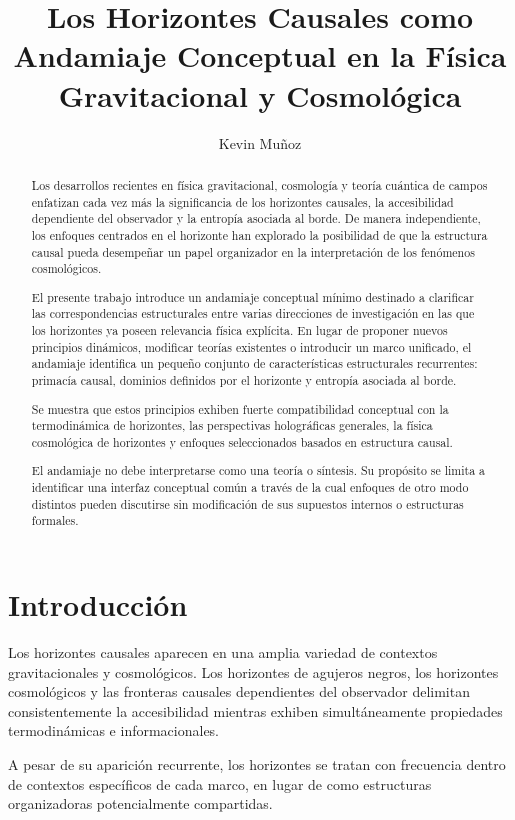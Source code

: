 \documentclass[12pt,a4paper]{article}
\title{Los Horizontes Causales como Andamiaje Conceptual en la F\'isica Gravitacional y Cosmol\'ogica}
\author{Kevin Mu\~noz}
\date{}
\begin{document}
\maketitle

\begin{abstract}
Los desarrollos recientes en física gravitacional, cosmología y teoría cuántica de campos enfatizan cada vez más la significancia de los horizontes causales, la accesibilidad dependiente del observador y la entropía asociada al borde. De manera independiente, los enfoques centrados en el horizonte han explorado la posibilidad de que la estructura causal pueda desempeñar un papel organizador en la interpretación de los fenómenos cosmológicos.

El presente trabajo introduce un andamiaje conceptual mínimo destinado a clarificar las correspondencias estructurales entre varias direcciones de investigación en las que los horizontes ya poseen relevancia física explícita. En lugar de proponer nuevos principios dinámicos, modificar teorías existentes o introducir un marco unificado, el andamiaje identifica un pequeño conjunto de características estructurales recurrentes: primacía causal, dominios definidos por el horizonte y entropía asociada al borde.

Se muestra que estos principios exhiben fuerte compatibilidad conceptual con la termodinámica de horizontes, las perspectivas holográficas generales, la física cosmológica de horizontes y enfoques seleccionados basados en estructura causal.

El andamiaje no debe interpretarse como una teoría o síntesis. Su propósito se limita a identificar una interfaz conceptual común a través de la cual enfoques de otro modo distintos pueden discutirse sin modificación de sus supuestos internos o estructuras formales.
\end{abstract}

\section{Introducción}

Los horizontes causales aparecen en una amplia variedad de contextos gravitacionales y cosmológicos. Los horizontes de agujeros negros, los horizontes cosmológicos y las fronteras causales dependientes del observador delimitan consistentemente la accesibilidad mientras exhiben simultáneamente propiedades termodinámicas e informacionales.

A pesar de su aparición recurrente, los horizontes se tratan con frecuencia dentro de contextos específicos de cada marco, en lugar de como estructuras organizadoras potencialmente compartidas.
\end{document}
